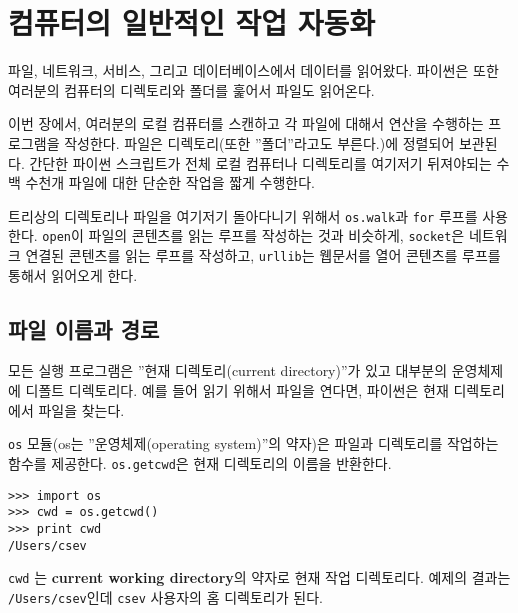 
\chapter{컴퓨터의 일반적인 작업 자동화}

파일, 네트워크, 서비스, 그리고 데이터베이스에서 데이터를 읽어왔다.
파이썬은 또한 여러분의 컴퓨터의 디렉토리와 폴더를 훑어서 파일도 읽어온다.

이번 장에서, 여러분의 로컬 컴퓨터를 스캔하고 각 파일에 대해서 연산을 수행하는 프로그램을 작성한다.
파일은 디렉토리(또한 ''폴더''라고도 부른다.)에 정렬되어 보관된다. 간단한 파이썬 스크립트가 
전체 로컬 컴퓨터나 디렉토리를 여기저기 뒤져야되는 수백 수천개 파일에 대한 단순한 작업을 짧게 수행한다. 

트리상의 디렉토리나 파일을 여기저기 돌아다니기 위해서 {\tt os.walk}과 {\tt for} 루프를 사용한다.
{\tt open}이 파일의 콘텐츠를 읽는 루프를 작성하는 것과 비슷하게,
{\tt socket}은 네트워크 연결된 콘텐츠를 읽는 루프를 작성하고,
{\tt urllib}는 웹문서를 열어 콘텐츠를 루프를 통해서 읽어오게 한다. 

\section{파일 이름과 경로}
\label{paths}


모든 실행 프로그램은 ''현재 디렉토리(current directory)''가 있고 대부분의 운영체제에 디폴트 디렉토리다.
예를 들어 읽기 위해서 파일을 연다면, 파이썬은 현재 디렉토리에서 파일을 찾는다.


{\tt os} 모듈(os는 ''운영체제(operating system)''의 약자)은 파일과 디렉토리를 작업하는 함수를 제공한다.
{\tt os.getcwd}은 현재 디렉토리의 이름을 반환한다.


\beforeverb
\begin{verbatim}
>>> import os
>>> cwd = os.getcwd()
>>> print cwd
/Users/csev
\end{verbatim}
\afterverb
%

{\tt cwd} 는 {\bf current working directory}의 약자로 현재 작업 디렉토리다.
예제의 결과는 {\tt /Users/csev}인데 {\tt csev} 사용자의 홈 디렉토리가 된다.


